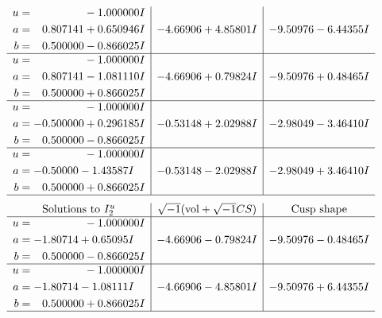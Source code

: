 \documentclass[1p]{elsarticle_modified}
\theoremstyle{definition}
\newcommand{\I}{\sqrt{-1}}
\begin{document}
$$\begin{array}{c|c|c}
\begin{aligned}
u &= \phantom{-0.000000 } -1.000000 I \\
a &= \phantom{-}0.807141 + 0.650946 I \\
b &= \phantom{-}0.500000 - 0.866025 I\end{aligned}
 & -4.66906 + 4.85801 I & -9.50976 - 6.44355 I \\ \hline\begin{aligned}
u &= \phantom{-0.000000 } -1.000000 I \\
a &= \phantom{-}0.807141 - 1.081110 I \\
b &= \phantom{-}0.500000 + 0.866025 I\end{aligned}
 & -4.66906 + 0.79824 I & -9.50976 + 0.48465 I \\ \hline\begin{aligned}
u &= \phantom{-0.000000 } -1.000000 I \\
a &= -0.500000 + 0.296185 I \\
b &= \phantom{-}0.500000 - 0.866025 I\end{aligned}
 & -0.53148 + 2.02988 I & -2.98049 - 3.46410 I \\ \hline\begin{aligned}
u &= \phantom{-0.000000 } -1.000000 I \\
a &= -0.50000 - 1.43587 I \\
b &= \phantom{-}0.500000 + 0.866025 I\end{aligned}
 & -0.53148 - 2.02988 I & -2.98049 + 3.46410 I\\
 \hline 
 \end{array}$$\newpage$$\begin{array}{c|c|c}  
\text{Solutions to }I^u_{2}& \I (\text{vol} + \sqrt{-1}CS) & \text{Cusp shape}\\
 \hline 
\begin{aligned}
u &= \phantom{-0.000000 } -1.000000 I \\
a &= -1.80714 + 0.65095 I \\
b &= \phantom{-}0.500000 - 0.866025 I\end{aligned}
 & -4.66906 - 0.79824 I & -9.50976 - 0.48465 I \\ \hline\begin{aligned}
u &= \phantom{-0.000000 } -1.000000 I \\
a &= -1.80714 - 1.08111 I \\
b &= \phantom{-}0.500000 + 0.866025 I\end{aligned}
 & -4.66906 - 4.85801 I & -9.50976 + 6.44355 I\\
 \hline 
 \end{array}$$\newpage
\end{document}
